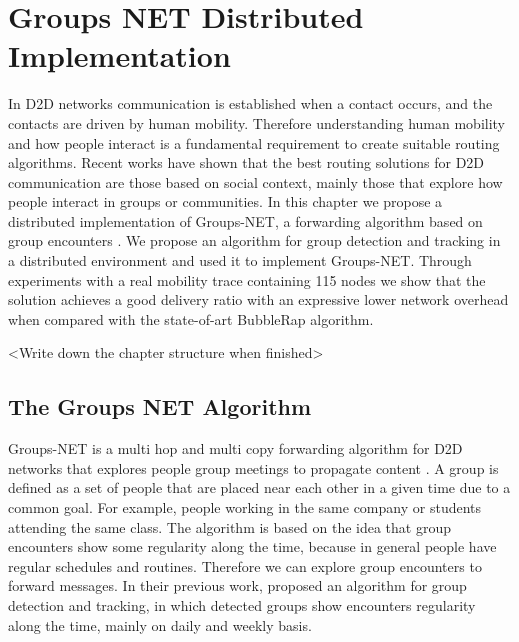\chapter{Groups NET Distributed Implementation}
\label{ch:GroupsNet}

In D2D networks communication is established when a contact occurs, and the contacts are driven by human mobility. Therefore understanding human mobility and how people interact is a fundamental requirement to create suitable routing algorithms. Recent works have shown that the best routing solutions for D2D communication are those based on social context, mainly those that explore how people interact in groups or communities. In this chapter we propose a distributed implementation of Groups-NET, a forwarding algorithm based on group encounters \citep{nunes2016leveraging}. We propose an algorithm for group detection and tracking in a distributed environment and used it to implement Groups-NET. Through experiments with a real mobility trace containing 115 nodes we show that the solution achieves a good delivery ratio with an expressive lower network overhead when compared with the state-of-art BubbleRap algorithm.

<Write down the chapter structure when finished>

\section{The Groups NET Algorithm}
\label{sec:groupsNet}

Groups-NET is a multi hop and multi copy forwarding algorithm for D2D networks that explores people group meetings to propagate content \citep{nunes2016leveraging}. A group is defined as a set of people that are placed near each other in a given time due to a common goal. For example, people working in the same company or students attending the same class. The algorithm is based on the idea that group encounters show some regularity along the time, because in general people have regular schedules and routines. Therefore we can explore group encounters to forward messages. In their previous work, \citet{groupMobility} proposed an algorithm for group detection and tracking, in which detected groups show encounters regularity along the time, mainly on daily and weekly basis.

